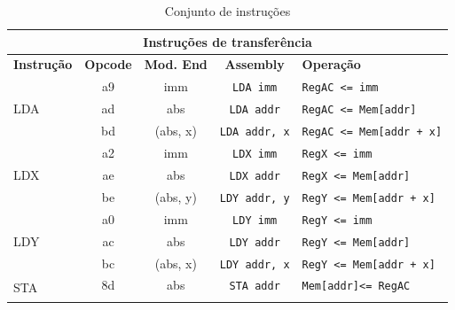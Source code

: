 \documentclass[
	12pt,				  %
	openright,		%
	a4paper,			%
	english,			%
	french,				%
	spanish,			%
	brazil,				%
]{abntex2}
\newcommand{\codenobg}[1]{\texttt{#1}}
\begin{document}
\begin{center}
	\fontsize{9}{11}\selectfont
	\begin{longtable}{|l|c|c|c|p{7cm}|}
		\caption{Conjunto de instruções} \label{tab:instSet}                                                                                   \\
		\hline
		\multicolumn{5}{|c|}{\textbf{Instruções de transferência}}                                                                             \\ \hline
		\textbf{Instrução}   & \textbf{Opcode} & \textbf{Mod. End} & \textbf{Assembly}      & \textbf{Operação}                                \\ \hline
		\multirow{3}{*}{LDA} & a9              & imm               & \codenobg{LDA imm}     & \codenobg{RegAC <= imm}                          \\ \cline{2-5}
		                     & ad              & abs               & \codenobg{LDA addr}    & \codenobg{RegAC <= Mem[addr]}                    \\ \cline{2-5}
		                     & bd              & (abs, x)          & \codenobg{LDA addr, x} & \codenobg{RegAC <= Mem[addr + x]}                \\ \hline
		\multirow{3}{*}{LDX} & a2              & imm               & \codenobg{LDX imm}     & \codenobg{RegX <= imm}                           \\ \cline{2-5}
		                     & ae              & abs               & \codenobg{LDX addr}    & \codenobg{RegX <= Mem[addr]}                     \\ \cline{2-5}
		                     & be              & (abs, y)          & \codenobg{LDY addr, y} & \codenobg{RegY <= Mem[addr + x]}                 \\ \hline
		\multirow{3}{*}{LDY} & a0              & imm               & \codenobg{LDY imm}     & \codenobg{RegY <= imm}                           \\ \cline{2-5}
		                     & ac              & abs               & \codenobg{LDY addr}    & \codenobg{RegY <= Mem[addr]}                     \\ \cline{2-5}
		                     & bc              & (abs, x)          & \codenobg{LDY addr, x} & \codenobg{RegY <= Mem[addr + x]}                 \\ \hline
		\multirow{2}{*}{STA} & 8d              & abs               & \codenobg{STA addr}    & \codenobg{Mem[addr]<= RegAC}                     \\ \cline{2-5}

\end{longtable}
\end{center}
\end{document}
